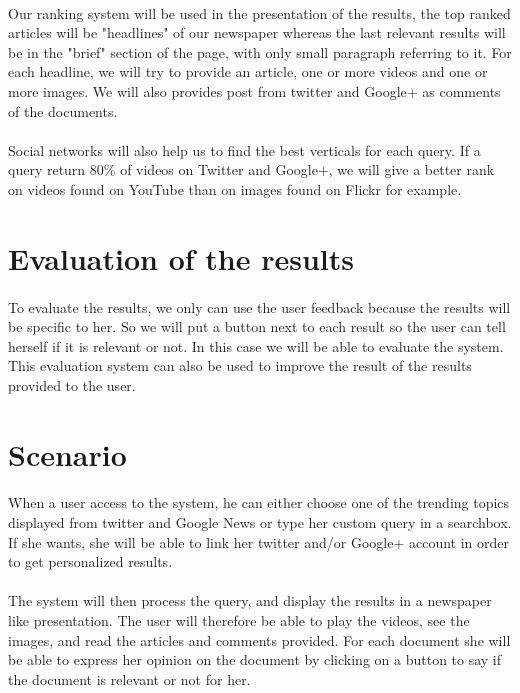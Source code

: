 \documentclass[english,7pt]{article}
\begin{document}
\paragraph{}Our ranking system will be used in the presentation of the results, the top ranked articles will be "headlines" of our newspaper whereas the last relevant results will be in the "brief" section of the page, with only small paragraph referring to it. For each headline, we will try to provide an article, one or more videos and one or more images. We will also provides post from twitter and Google+ as comments of the documents.

\paragraph{}Social networks will also help us to find the best verticals for each query. If a query return 80\% of videos on Twitter and Google+, we will give a better rank on videos found on YouTube than on images found on Flickr for example.

\section{Evaluation of the results}

\paragraph{}To evaluate the results, we only can use the user feedback because the results will be specific to her. So we will put a button next to each result so the user can tell herself if it is relevant or not. In this case we will be able to evaluate the system. This evaluation system can also be used to improve the result of the results provided to the user.

\section{Scenario}

\paragraph{}When a user access to the system, he can either choose one of the trending topics displayed from twitter and Google News or type her custom query in a searchbox. If she wants, she will be able to link her twitter and/or Google+ account in order to get personalized results.

\paragraph{}The system will then process the query, and display the results in a newspaper like presentation. The user will therefore be able to play the videos, see the images, and read the articles and comments provided. For each document she will be able to express her opinion on the document by clicking on a button to say if the document is relevant or not for her.
\end{document}
